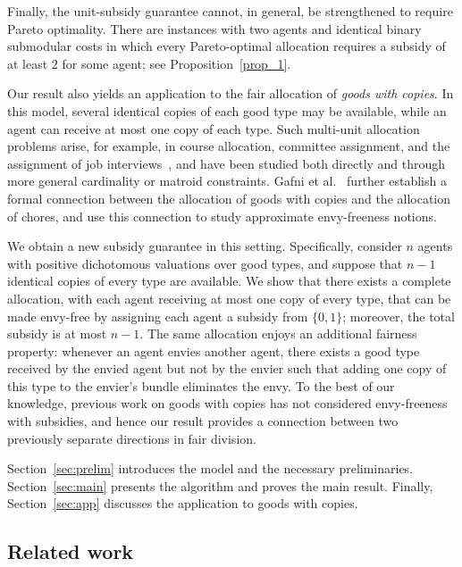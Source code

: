 \documentclass[sigconf,anonymous]{aamas}
\theoremstyle{acmplain}
\theoremstyle{acmdefinition}
\theoremstyle{acmplain}
\begin{document}
Finally, the unit-subsidy guarantee cannot, in general, be strengthened to require Pareto optimality. There are instances with two agents and identical binary submodular costs in which every Pareto-optimal allocation requires a subsidy of at least $2$ for some agent; see Proposition~\ref{prop_1}.

Our result also yields an application to the fair allocation of \emph{goods with copies}. In this model, several identical copies of each good type may be available, while an agent can receive at most one copy of each type. Such multi-unit allocation problems arise, for example, in course allocation, committee assignment, and the assignment of job interviews~\cite{ortega2020multi}, and have been studied both directly and through more general cardinality or matroid constraints. Gafni et al.~\cite{gafni2023unified} further establish a formal connection between the allocation of goods with copies and the allocation of chores, and use this connection to study approximate envy-freeness notions.

We obtain a new subsidy guarantee in this setting. Specifically, consider $n$ agents with positive dichotomous valuations over good types, and suppose that $n-1$ identical copies of every type are available. We show that there exists a complete allocation, with each agent receiving at most one copy of every type, that can be made envy-free by assigning each agent a subsidy from $\{0,1\}$; moreover, the total subsidy is at most $n-1$. The same allocation enjoys an additional fairness property: whenever an agent envies another agent, there exists a good type received by the envied agent but not by the envier such that adding one copy of this type to the envier's bundle eliminates the envy. To the best of our knowledge, previous work on goods with copies has not considered envy-freeness with subsidies, and hence our result provides a connection between two previously separate directions in fair division.


Section~\ref{sec:prelim} introduces the model and the necessary preliminaries. Section~\ref{sec:main} presents the algorithm and proves the main result. Finally, Section~\ref{sec:app} discusses the application to goods with copies.


\subsection{Related work}
\end{document}
